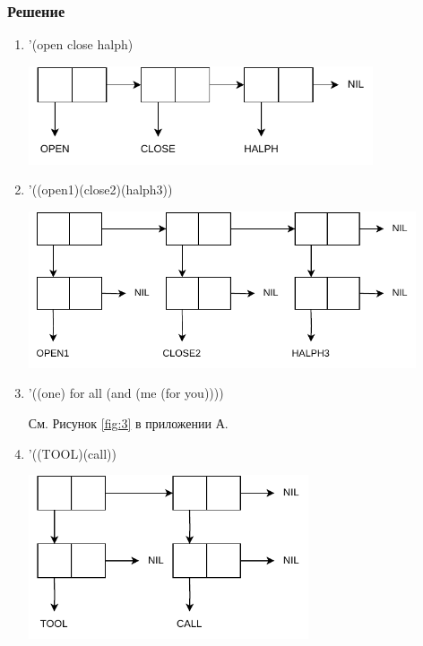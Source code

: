 \documentclass[a4paper,oneside,14pt]{extarticle}
\begin{document}
\subsubsection*{Решение}

\begin{enumerate}
    \item '(open close halph)
\begin{center}
    \includegraphics[width=0.8\textwidth]{img/list1.pdf}
\end{center}

\newpage

\item '((open1)(close2)(halph3))
\begin{center}
    \includegraphics[width=0.9\textwidth]{img/list2.pdf}
\end{center}

\item '((one) for all (and (me (for you))))

См. Рисунок \ref{fig:3} в приложении А.

\item '((TOOL)(call))
\begin{center}
    \includegraphics[width=0.65\textwidth]{img/list4.pdf}
\end{center}


\end{enumerate}
\end{document}
